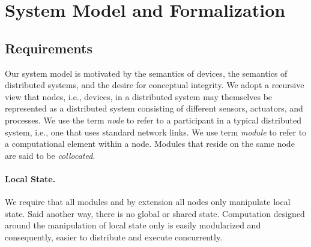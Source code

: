 \section{System Model and Formalization\label{system_model}}

\subsection{Requirements}

Our system model is motivated by the semantics of devices, the semantics of distributed systems, and the desire for conceptual integrity.
We adopt a recursive view that nodes, i.e., devices, in a distributed system may themselves be represented as a distributed system consisting of different sensors, actuators, and processes.
We use the term \emph{node} to refer to a participant in a typical distributed system, i.e., one that uses standard network links.
We use term \emph{module} to refer to a computational element within a node.
Modules that reside on the same node are said to be \emph{collocated}.

\paragraph{Local State.}
We require that all modules and by extension all nodes only manipulate local state.
Said another way, there is no global or shared state.
Computation designed around the manipulation of local state only is easily modularized and consequently, easier to distribute and execute concurrently.



